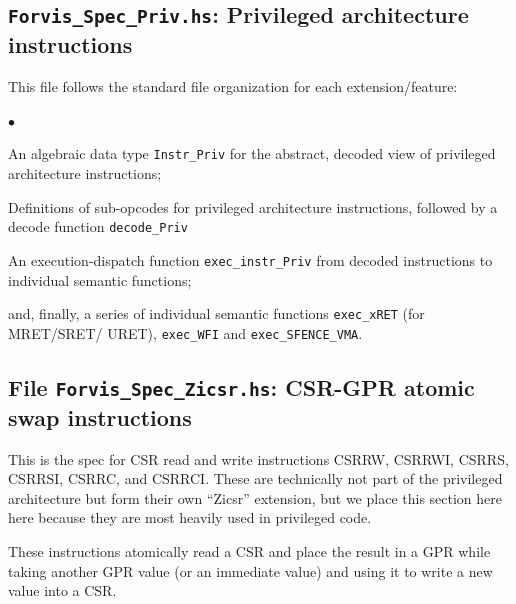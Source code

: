 \documentclass[11pt]{article}
\newenvironment{tightlist}%
{\begin{list}{$\bullet$}{%
    \setlength{\topsep}{0in}
    \setlength{\partopsep}{0in}
    \setlength{\itemsep}{0in}
    \setlength{\parsep}{0in}
    \setlength{\leftmargin}{1.5em}
    \setlength{\rightmargin}{0in}
    \setlength{\itemindent}{0in}
}
}%
{\end{list}
}
\begin{document}



\subsection{{\tt Forvis\_Spec\_Priv.hs}: Privileged architecture instructions}

This file follows the standard file organization for each extension/feature:

\begin{tightlist}

\item An algebraic data type \verb|Instr_Priv| for the abstract,
decoded view of privileged architecture instructions;

\item Definitions of sub-opcodes for privileged architecture
instructions, followed by a decode function \verb|decode_Priv|

\item An execution-dispatch function \verb|exec_instr_Priv| from
decoded instructions to individual semantic functions;

\item and, finally, a series of individual semantic functions
\verb|exec_xRET| (for MRET/SRET/ URET), \verb|exec_WFI| and
\verb|exec_SFENCE_VMA|.

\end{tightlist}


\subsection{File {\tt Forvis\_Spec\_Zicsr.hs}: CSR-GPR atomic swap instructions}

This is the spec for CSR read and write instructions CSRRW, CSRRWI,
CSRRS, CSRRSI, CSRRC, and CSRRCI.  These are technically not part of
the privileged architecture but form their own ``Zicsr'' extension,
but we place this section here here because they are most heavily used
in privileged code.

These instructions atomically read a CSR and place the result in a GPR
while taking another GPR value (or an immediate value) and using it to
write a new value into a CSR.

\end{document}
